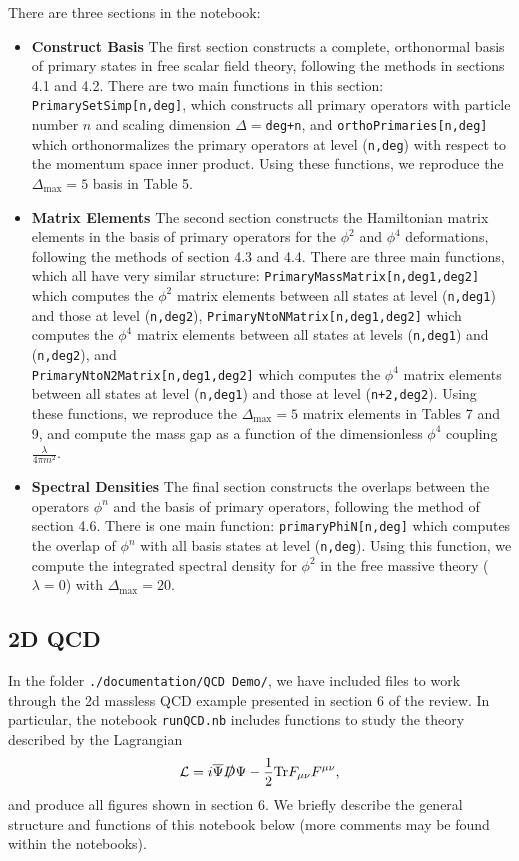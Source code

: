\documentclass[12pt]{article}
\newcommand{\Lcal}{{\mathcal L}}
\newcommand\De\Delta
\newcommand{\fr}{\frac}
\newcommand{\Dmax}{\De_{\max}}
\newcommand{\Tr}{\textrm{Tr}}
\newcommand{\Psibar}{\overline{\Psi}}
\begin{document}
There are three sections in the notebook:
\begin{itemize}
\item \textbf{Construct Basis}\newline
The first section constructs a complete, orthonormal basis of primary states in free scalar field theory, following the methods in sections 4.1 and 4.2. There are two main functions in this section: {\tt PrimarySetSimp[n,deg]}, which constructs all primary operators with particle number $n$ and scaling dimension $\De=${\tt deg+n}, and {\tt orthoPrimaries[n,deg]} which orthonormalizes the primary operators at level ({\tt n,deg}) with respect to the momentum space inner product. Using these functions, we reproduce the $\Dmax=5$ basis in Table 5.
\item \textbf{Matrix Elements} \newline
The second section constructs the Hamiltonian matrix elements in the basis of primary operators for the $\phi^2$ and $\phi^4$ deformations, following the methods of section 4.3 and 4.4. There are three main functions, which all have very similar structure: {\tt PrimaryMassMatrix[n,deg1,deg2]} which computes the $\phi^2$ matrix elements between all states at level ({\tt n,deg1}) and those at level ({\tt n,deg2}), {\tt PrimaryNtoNMatrix[n,deg1,deg2]} which computes the $\phi^4$ matrix elements between all states at levels ({\tt n,deg1}) and ({\tt n,deg2}), and \\{\tt PrimaryNtoN2Matrix[n,deg1,deg2]} which computes the $\phi^4$ matrix elements between all states at level ({\tt n,deg1}) and those at level ({\tt n+2,deg2}). Using these functions, we reproduce the $\Dmax=5$ matrix elements in Tables 7 and 9, and compute the mass gap as a function of the dimensionless $\phi^4$ coupling $\fr{\lambda}{4\pi m^2}$.
\item \textbf{Spectral Densities} \newline
The final section constructs the overlaps between the operators $\phi^n$ and the basis of primary operators, following the method of section 4.6. There is one main function: {\tt primaryPhiN[n,deg]} which computes the overlap of $\phi^n$ with all basis states at level ({\tt n,deg}). Using this function, we compute the integrated spectral density for $\phi^2$ in the free massive theory ($\lambda=0$) with $\Dmax=20$.
\end{itemize}

\subsection{2D QCD}
\label{sec:2dQCD}
 In the folder {\tt ./documentation/QCD Demo/}, we have included files to work through the 2d massless QCD example presented in section 6 of the review. In particular, the notebook {\tt runQCD.nb} includes functions to study the theory described by the Lagrangian \begin{equation}
  \Lcal= i \Psibar \slashed{D} \Psi - \frac{1}{2}\Tr F_{\mu\nu}F^{\mu\nu},
\end{equation} and produce all figures shown in section 6. We briefly describe the general structure and functions of this notebook below (more comments may be found within the notebooks).
\end{document}
